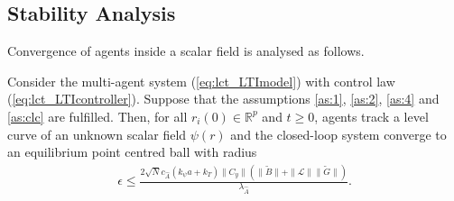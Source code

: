 

\subsection{Stability Analysis}  \label{sec:lc_stability}
Convergence of agents inside a scalar field is analysed as follows. 


\begin{theorem}
Consider the multi-agent system (\ref{eq:lct_LTImodel}) with control law (\ref{eq:lct_LTIcontroller}). Suppose that the assumptions \ref{as:1}, \ref{as:2}, \ref{as:4} and \ref{as:clc} are fulfilled. Then, for all $r_i(0) \in \mathbb{R}^p $ and $t \geq 0$,  agents track a level curve of an unknown scalar field $\psi(r)$ and the  closed-loop system converge to an equilibrium point centred ball with radius
\begin{align}\label{eq:lct_radiusLTI}
\epsilon \leq \frac{2\sqrt{N} c_{\hat{A}} (k_{\psi}a+k_T) \|C_y\| \left(\|\tilde{B}\| + \|\mathcal{L}\|\|\tilde{G}\|\right)}{\lambda_{\hat{A}}}.
\end{align}
\end{theorem}



